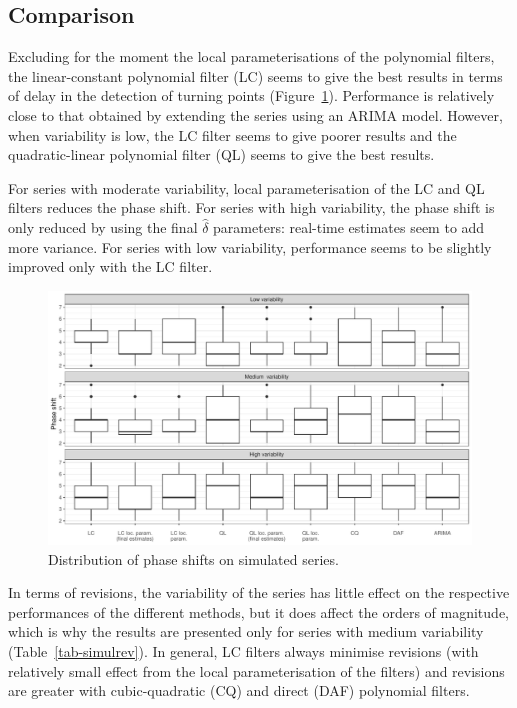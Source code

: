\documentclass[
]{article}
\newcommand\1{\mathds{1}}
\begin{document}
\hypertarget{comparison}{%
\subsection{Comparison}\label{comparison}}

Excluding for the moment the local parameterisations of the polynomial
filters, the linear-constant polynomial filter (LC) seems to give the
best results in terms of delay in the detection of turning points
(Figure~\ref{fig-graphstpsimul}). Performance is relatively close to
that obtained by extending the series using an ARIMA model. However,
when variability is low, the LC filter seems to give poorer results and
the quadratic-linear polynomial filter (QL) seems to give the best
results.

For series with moderate variability, local parameterisation of the LC
and QL filters reduces the phase shift. For series with high
variability, the phase shift is only reduced by using the final
\(\hat\delta\) parameters: real-time estimates seem to add more
variance. For series with low variability, performance seems to be
slightly improved only with the LC filter.

\begin{figure}[H]

\caption{\label{fig-graphstpsimul}Distribution of phase shifts on
simulated series.}

{\centering \includegraphics[width=1\textwidth,height=\textheight]{img/simulations/phase_shift_simul.pdf}

}

\end{figure}

In terms of revisions, the variability of the series has little effect
on the respective performances of the different methods, but it does
affect the orders of magnitude, which is why the results are presented
only for series with medium variability (Table~\ref{tab-simulrev}). In
general, LC filters always minimise revisions (with relatively small
effect from the local parameterisation of the filters) and revisions are
greater with cubic-quadratic (CQ) and direct (DAF) polynomial filters.
\end{document}
